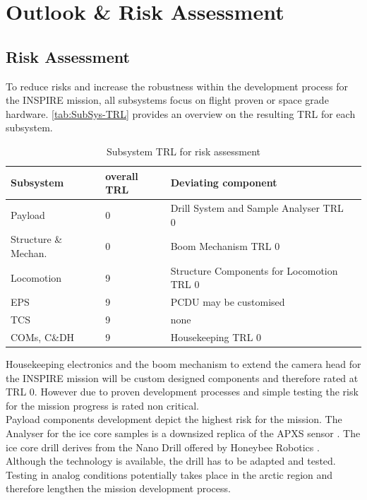 \chapter{Outlook \& Risk Assessment}
\label{chap:outlook}

\section{Risk Assessment}
\label{sec:RiskAssessment}

To reduce risks and increase the robustness within the development process for the INSPIRE mission, all subsystems focus on flight proven or space grade hardware. \autoref{tab:SubSys-TRL} provides an overview on the resulting TRL for each subsystem. 
 
\begin{table}[h]
\centering
\caption{Subsystem TRL for risk assessment}
\begin{tabular}{llll}
\toprule
Subsystem            & overall TRL & Deviating component      &  \\
\midrule
Payload              & 0           & Drill System and Sample Analyser TRL 0 &  \\
Structure \& Mechan. & 0           & Boom Mechanism TRL 0     &  \\
Locomotion           & 9           & Structure Components for Locomotion TRL 0                     &  \\
EPS                  & 9           & PCDU may be customised                     &  \\
TCS                  & 9           & none                     &  \\
COMs, C\&DH          & 9           & Housekeeping TRL 0       & 	 \\
\bottomrule
\end{tabular}
\label{tab:SubSys-TRL}
\end{table}

Housekeeping electronics and the boom mechanism to extend the camera head for the INSPIRE mission will be custom designed components and therefore rated at TRL 0. However due to proven development processes and simple testing the risk for the mission progress is rated non critical.  \\

Payload components development depict the highest risk for the mission. The Analyser for the ice core samples is a downsized replica of the APXS sensor \cite{ref_pay_1, ref_pay_2}. 
The ice core drill derives from the Nano Drill offered by Honeybee Robotics \cite{6497188}. Although the technology is available, the drill has to be adapted and tested. Testing in analog conditions potentially takes place in the arctic region and therefore lengthen the mission development process. \\

